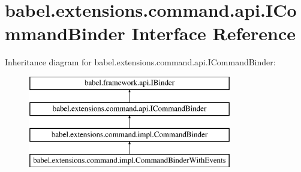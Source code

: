 \hypertarget{interfacebabel_1_1extensions_1_1command_1_1api_1_1_i_command_binder}{\section{babel.\-extensions.\-command.\-api.\-I\-Command\-Binder Interface Reference}
\label{interfacebabel_1_1extensions_1_1command_1_1api_1_1_i_command_binder}
}
Inheritance diagram for babel.\-extensions.\-command.\-api.\-I\-Command\-Binder\-:\begin{figure}[H]
\begin{center}
\leavevmode
\includegraphics[height=4.000000cm]{interfacebabel_1_1extensions_1_1command_1_1api_1_1_i_command_binder}
\end{center}
\end{figure}
